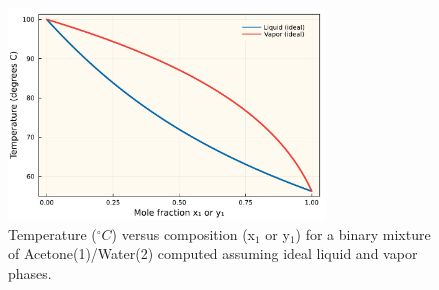 \begin{figure}[h!]\centering
\captionsetup{width=0.75\linewidth}
\includegraphics[width=0.75\textwidth]{./figs/Fig-Txy-acetone-water-ideal-P101_325-kPa.pdf}
\caption{Temperature ($^{\circ}C$) versus composition (x$_{1}$ or y$_{1}$) for a binary mixture of Acetone(1)/Water(2) computed assuming ideal liquid and vapor phases.}\label{fig-VLE-ideal-problem-Txy}
\end{figure}

